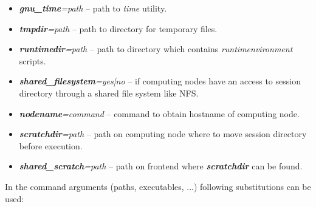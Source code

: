 \documentclass{article}                            %
\begin{document}
\begin{itemize}
\item \textbf{\textit{gnu\_time}}\textit{=path} -- path to \emph{time} utility.
\item \textbf{\textit{tmpdir}}\textit{=path} -- path to directory for temporary
files.
\item \textbf{\textit{runtimedir}}\textit{=path} -- path to directory which
contains \emph{runtimenvironment} scripts.
\item \textbf{\textit{shared\_filesystem}}\textit{=yes|no} -- if computing
nodes have an access to session directory through a shared file system
like NFS. 
\item \textbf{\textit{nodename}}\textit{=command} -- command to obtain hostname
of computing node.
\item \textbf{\textit{scratchdir}}\textit{=path} -- path on computing node
where to move session directory before execution.
\item \textbf{\textit{shared\_scratch}}\textit{=path} -- path on frontend
where \textbf{\textit{scratchdir}} can be found.
\end{itemize}

In the command arguments (paths, executables, ...) following substitutions
can be used:
\end{document}
